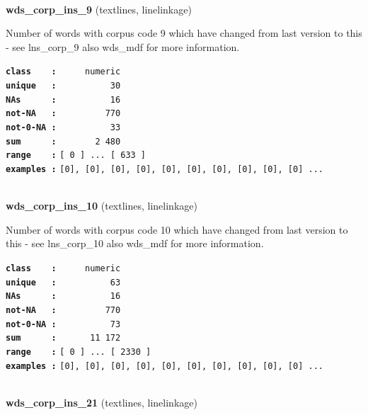 \documentclass[]{article}
\begin{document}
~

\textbf{wds\_corp\_ins\_9} (textlines, linelinkage)

Number of words with corpus code 9 which have changed from last version
to this - see lns\_corp\_9 also wds\_mdf for more information.

\textbf{\texttt{class\ \ \ \ :}} \texttt{~~~~~numeric}\\
\textbf{\texttt{unique\ \ \ :}} \texttt{~~~~~~~~~~30}\\
\textbf{\texttt{NAs\ \ \ \ \ \ :}} \texttt{~~~~~~~~~~16}\\
\textbf{\texttt{not-NA\ \ \ :}} \texttt{~~~~~~~~~770}\\
\textbf{\texttt{not-0-NA\ :}} \texttt{~~~~~~~~~~33}\\
\textbf{\texttt{sum\ \ \ \ \ \ :}} \texttt{~~~~~~~2~480}\\
\textbf{\texttt{range\ \ \ \ :}}
\texttt{{[}\ 0\ {]}\ ...\ {[}\ 633\ {]}}\\
\textbf{\texttt{examples\ :}}
\texttt{{[}0{]},\ {[}0{]},\ {[}0{]},\ {[}0{]},\ {[}0{]},\ {[}0{]},\ {[}0{]},\ {[}0{]},\ {[}0{]},\ {[}0{]}\ ...}\\

~

\textbf{wds\_corp\_ins\_10} (textlines, linelinkage)

Number of words with corpus code 10 which have changed from last version
to this - see lns\_corp\_10 also wds\_mdf for more information.

\textbf{\texttt{class\ \ \ \ :}} \texttt{~~~~~numeric}\\
\textbf{\texttt{unique\ \ \ :}} \texttt{~~~~~~~~~~63}\\
\textbf{\texttt{NAs\ \ \ \ \ \ :}} \texttt{~~~~~~~~~~16}\\
\textbf{\texttt{not-NA\ \ \ :}} \texttt{~~~~~~~~~770}\\
\textbf{\texttt{not-0-NA\ :}} \texttt{~~~~~~~~~~73}\\
\textbf{\texttt{sum\ \ \ \ \ \ :}} \texttt{~~~~~~11~172}\\
\textbf{\texttt{range\ \ \ \ :}}
\texttt{{[}\ 0\ {]}\ ...\ {[}\ 2330\ {]}}\\
\textbf{\texttt{examples\ :}}
\texttt{{[}0{]},\ {[}0{]},\ {[}0{]},\ {[}0{]},\ {[}0{]},\ {[}0{]},\ {[}0{]},\ {[}0{]},\ {[}0{]},\ {[}0{]}\ ...}\\

~

\textbf{wds\_corp\_ins\_21} (textlines, linelinkage)
\end{document}

